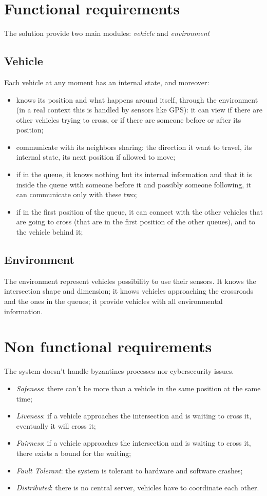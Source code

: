 \documentclass{memoir}
\begin{document}
\section{Functional requirements}
The solution provide two main modules: \emph{vehicle} and \emph{environment}

\subsection{Vehicle}
Each vehicle at any moment has an internal state, and moreover:

\begin{itemize}
	\item knows its position and what happens around itself, through the environment (in a real context this is handled by sensors like GPS): it can view if there are other vehicles trying to cross, or if there are someone before or after its position;
	\item communicate with its neighbors sharing: the direction it want to travel, its internal state, its next position if allowed to move;
	\item if in the queue, it knows nothing but its internal information and that it is inside the queue with someone before it and possibly someone following, it can communicate only with these two;
	\item if in the first position of the queue, it can connect with the other vehicles that are going to cross (that are in the first position of the other queues), and to the vehicle behind it;
\end{itemize}

\subsection{Environment}
The environment represent vehicles possibility to use their sensors. It knows the intersection shape and dimension; it knows vehicles approaching the crossroads and the ones in the queues; it provide vehicles with all environmental information.

\section{Non functional requirements}
The system doesn't handle byzantines processes nor cybersecurity issues.

\begin{itemize}
	\item \emph{Safeness}: there can't be more than a vehicle in the same position at the same time;
	\item \emph{Liveness}: if a vehicle approaches the intersection and is waiting to cross it, eventually it will cross it;
	\item \emph{Fairness}: if a vehicle approaches the intersection and is waiting to cross it, there exists a bound for the waiting;
	\item \emph{Fault Tolerant}: the system is tolerant to hardware and software crashes;
	\item \emph{Distributed}: there is no central server, vehicles have to coordinate each other.
\end{itemize}
\end{document}
